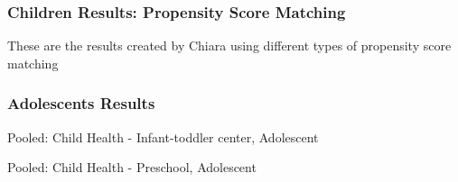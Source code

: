 \begin{table}[H]
\begin{table}[H]
\begin{table}[H]
\begin{table}[H]
\begin{table}[H]
\begin{table}[H]
\begin{small}
%  
%
%  
%
%  
%

\end{small}

\pagebreak
\subsubsection{Children Results: Propensity Score Matching}
These are the results created by Chiara using different types of propensity score matching
\begin{small}

\end{small}

\pagebreak
\subsubsection{Adolescents Results}
\begin{table}[H]
\caption{Pooled: Child Health - Infant-toddler center, Adolescent}
  
\end{table}
\begin{table}[H]
\caption{Pooled: Child Health - Preschool, Adolescent}

\end{table}


\end{table}
\end{table}
\end{table}
\end{table}
\end{table}
\end{table}
